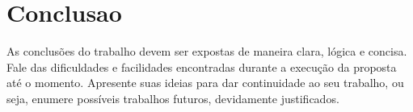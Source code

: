\chapter{Conclusao}\label{cap:conclusao}

As conclusões do trabalho devem ser expostas de maneira clara, lógica e concisa. Fale das dificuldades e facilidades encontradas durante a execução da proposta até o momento. Apresente suas ideias para dar continuidade ao seu trabalho, ou seja, enumere possíveis trabalhos futuros, devidamente justificados.